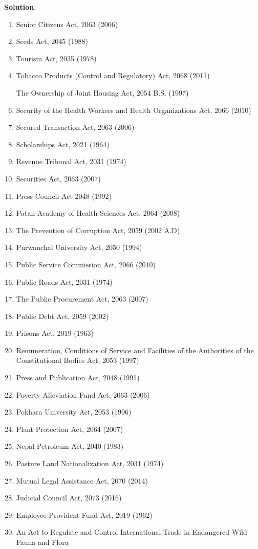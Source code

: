\documentclass[
  openany]{book}
\newenvironment{solution}{ {\bfseries Solution}:}{}
\begin{document}
\begin{questions}
\begin{solution}
\begin{enumerate}
\item Senior Citizens Act, 2063 (2006)
\item Seeds Act, 2045 (1988)
\item Tourism Act, 2035 (1978)
\item Tobacco Products (Control and Regulatory) Act, 2068 (2011)
\item [The] Ownership of Joint Housing Act, 2054 B.S. (1997)
\item Security of the Health Workers and Health Organizations Act, 2066 (2010)
\item Secured Transaction Act, 2063 (2006)
\item Scholarships Act, 2021 (1964)
\item Revenue Tribunal Act, 2031 (1974)
\item Securities Act, 2063 (2007)
\item Press Council Act 2048 (1992) 
\item Patan Academy of Health Sciences Act, 2064 (2008)
\item The Prevention of Corruption Act, 2059 (2002 A.D)
\item Purwanchal University Act, 2050 (1994)
\item Public Service Commission Act, 2066 (2010)
\item Public Roads Act, 2031 (1974)
\item The Public Procurement Act, 2063 (2007)
\item Public Debt Act, 2059 (2002)
\item Prisons Act, 2019 (1963)
\item Remuneration, Conditions of Service and Facilities of the Authorities of the Constitutional Bodies Act, 2053 (1997)
\item Press and Publication Act, 2048 (1991)
\item Poverty Alleviation Fund Act, 2063 (2006)
\item Pokhara University Act, 2053 (1996)
\item Plant Protection Act, 2064 (2007)
\item Nepal Petroleum Act, 2040 (1983)
\item Pasture Land Nationalization Act, 2031 (1974)
\item Mutual Legal Assistance Act, 2070 (2014)
\item Judicial Council Act, 2073 (2016)
\item Employee Provident Fund Act, 2019 (1962)
\item An Act to Regulate and Control International Trade in Endangered Wild Fauna and Flora

\end{enumerate}
\end{solution}
\end{questions}
\end{document}

